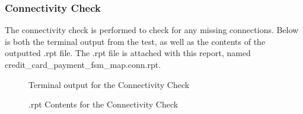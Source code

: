\documentclass[12pt]{article}
\begin{document}
\subsubsection{Connectivity Check} %
The connectivity check is performed to check for any missing connections. Below is both the terminal output from the test, as well as the contents of the outputted .rpt file. The .rpt file is attached with this report, named credit\_card\_payment\_fsm\_map.conn.rpt.
\begin{figure} [H]
    \centering
    \caption{Terminal output for the Connectivity Check}
\end{figure}
\begin{figure} [H]
    \centering
    \caption{.rpt Contents for the Connectivity Check}
\end{figure}
\end{document}
